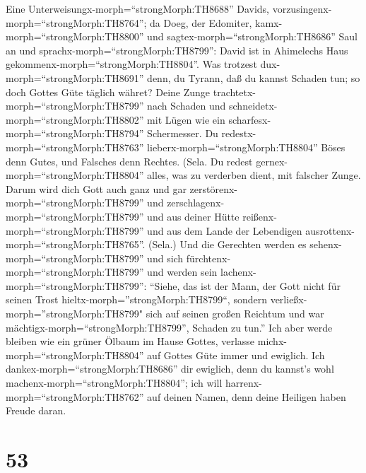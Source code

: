  Eine Unterweisungx-morph=``strongMorph:TH8688'' Davids,
vorzusingenx-morph=``strongMorph:TH8764''; da Doeg, der Edomiter,
kamx-morph=``strongMorph:TH8800'' und
sagtex-morph=``strongMorph:TH8686'' Saul an und
sprachx-morph=``strongMorph:TH8799'': David ist in Ahimelechs Haus
gekommenx-morph=``strongMorph:TH8804''. Was trotzest
dux-morph=``strongMorph:TH8691'' denn, du Tyrann, daß du kannst Schaden
tun; so doch Gottes Güte täglich währet?  Deine Zunge
trachtetx-morph=``strongMorph:TH8799'' nach Schaden und
schneidetx-morph=``strongMorph:TH8802'' mit Lügen wie ein
scharfesx-morph=``strongMorph:TH8794'' Schermesser.  Du
redestx-morph=``strongMorph:TH8763''
lieberx-morph=``strongMorph:TH8804'' Böses denn Gutes, und Falsches denn
Rechtes. (Sela.  Du redest
gernex-morph=``strongMorph:TH8804'' alles, was zu verderben dient, mit
falscher Zunge.  Darum wird dich Gott auch ganz und gar
zerstörenx-morph=``strongMorph:TH8799'' und
zerschlagenx-morph=``strongMorph:TH8799'' und aus deiner Hütte
reißenx-morph=``strongMorph:TH8799'' und aus dem Lande der Lebendigen
ausrottenx-morph=``strongMorph:TH8765''. (Sela.)  Und die
Gerechten werden es sehenx-morph=``strongMorph:TH8799'' und sich
fürchtenx-morph=``strongMorph:TH8799'' und werden sein
lachenx-morph=``strongMorph:TH8799'':  ``Siehe, das ist der
Mann, der Gott nicht für seinen Trost
hieltx-morph=''strongMorph:TH8799``, sondern
verließx-morph=''strongMorph:TH8799" sich auf seinen großen Reichtum und
war mächtigx-morph=``strongMorph:TH8799'', Schaden zu tun.''
 Ich aber werde bleiben wie ein grüner Ölbaum im Hause
Gottes, verlasse michx-morph=``strongMorph:TH8804'' auf Gottes Güte
immer und ewiglich.  Ich dankex-morph=``strongMorph:TH8686''
dir ewiglich, denn du kannst's wohl
machenx-morph=``strongMorph:TH8804''; ich will
harrenx-morph=``strongMorph:TH8762'' auf deinen Namen, denn deine
Heiligen haben Freude daran.

\hypertarget{section-52}{%
\section{53}\label{section-52}}

